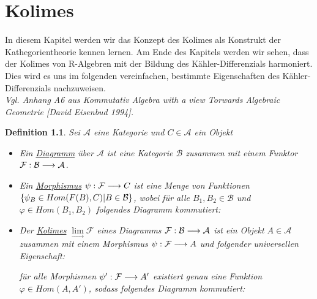 \documentclass[10pt,a4paper]{report}
\newcommand{\comment}[1]{}
\newcommand{\ModulsOfDifferenzials}{Kommutativ Algebra with a view Torwards Algebraic Geometrie [David Eisenbud 1994]}
\newcounter{Aussage}[chapter]
\newtheorem{definition}[Aussage]{Definition}
\newcommand{\functionfront}[3]{\nolinebreak{#1:#2 \longrightarrow #3}}
\newcommand{\colimes}[0]{\lim\limits_{ \longrightarrow }}
\begin{document}
\chapter{Kolimes}
In diesem Kapitel werden wir das Konzept des Kolimes als Konstrukt der Kathegorientheorie kennen lernen. Am Ende des Kapitels werden wir sehen, dass der Kolimes von R-Algebren mit der Bildung des Kähler-Differenzials harmoniert. Dies wird es uns im folgenden vereinfachen, bestimmte Eigenschaften des Kähler-Differenzials nachzuweisen.\\
\textit{Vgl. Anhang A6 aus \ModulsOfDifferenzials .}
\begin{definition}
Sei $\mathcal{A}$ eine Kategorie und $C \in \mathcal{A}$ ein Objekt
\begin{itemize}
\item Ein \underline{Diagramm} über $\mathcal{A}$ ist eine Kategorie $\mathcal{B}$ zusammen mit einem Funktor $\functionfront{\mathcal{F}}{\mathcal{B}}{\mathcal{A}}$.
\item Ein \underline{Morphismus} $\functionfront{\psi}{\mathcal{F}}{C}$ ist eine Menge von Funktionen 
$\nolinebreak{\lbrace \psi_B \in Hom(F(B),C) \vert B \in \mathcal{B} \rbrace}$, wobei für alle $B_1,B_2 \in \mathcal{B}$ und $\varphi \in Hom(B_1,B_2)$ folgendes Diagramm kommutiert:
\begin{center}
\end{center}
\item Der \underline{Kolimes} $\colimes \mathcal{F}$ eines Diagramms $\functionfront{\mathcal{F}}{\mathcal{B}}{\mathcal{A}}$ ist ein Objekt $A \in \mathcal{A}$ zusammen mit einem Morphismus $\functionfront{\psi}{\mathcal{F}}{A}$ und folgender universellen Eigenschaft:
\begin{center}
\comment{$\forall Morphismen \functionfront{\psi '}{\mathcal{F}}{\mathcal{A}'}\exists ! \varphi \in Hom_{\mathcal{A}}(A,A') \forall B \in \mathcal{B}: \varphi \circ \psi_B = \psi'_B $}

für alle Morphismen $\functionfront{\psi '}{\mathcal{F}}{A'}$ existiert genau eine Funktion $\varphi \in Hom(A,A')$, sodass folgendes Diagramm kommutiert:
\end{center}

\end{itemize}
\end{definition}
\end{document}
